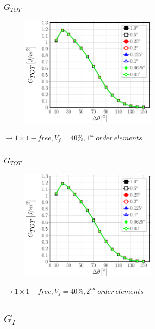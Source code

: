 \documentclass[first,firstsupp,lastsupp,last,hyperref,table]{ETHclass}
\begin{document}
\addtocounter{framenumber}{-1}

\begin{frame}
\frametitle{\vspace{0.25cm}\small $G_{TOT}$}
\vspace{-.75cm}
\centering
\begin{figure}
\centering
\includegraphics[width=0.6\textwidth]{Vf40-free-1st-GTOT.pdf}
\end{figure}
$\rightarrow 1\times1-free, V_{f}=40\%, 1^{st}\ order\ elements$ 
\end{frame}

\addtocounter{framenumber}{-1}

\begin{frame}
\frametitle{\vspace{0.25cm}\small $G_{TOT}$}
\vspace{-.75cm}
\centering
\begin{figure}
\centering
\includegraphics[width=0.6\textwidth]{Vf40-free-2nd-GTOT.pdf}
\end{figure}
$\rightarrow 1\times1-free, V_{f}=40\%, 2^{nd}\ order\ elements$ 
\end{frame}

\subsection{$G_{I}$}
\end{document}
